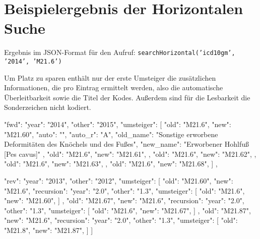 \section{Beispielergebnis der Horizontalen Suche}
\label{search-horizontal-example}

Ergebnis im JSON-Format für den Aufruf: \newline \texttt{searchHorizontal('icd10gm', '2014', 'M21.6')}

Um Platz zu sparen enthält nur der erste Umsteiger die zusätzlichen Informationen, die pro Eintrag ermittelt werden, also die automatische Überleitbarkeit sowie die Titel der Kodes. Außerdem sind für die Lesbarkeit die Sonderzeichen nicht kodiert. \\

\begin{Code}
{
  "fwd": {
    "year": "2014",
    "other": "2015",
    "umsteiger": [
      {
        "old": "M21.6",
        "new": "M21.60",
        "auto": "",
        "auto_r": "A",
        "old_name": "Sonstige erworbene Deformitäten des Knöchels und des Fußes",
        "new_name": "Erworbener Hohlfuß [Pes cavus]"
      },
      {
        "old": "M21.6",
        "new": "M21.61",
      },
      {
        "old": "M21.6",
        "new": "M21.62",
      },
      {
        "old": "M21.6",
        "new": "M21.63",
      },
      {
        "old": "M21.6",
        "new": "M21.68",
      }
    ]
  },









  "rev": {
    "year": "2013",
    "other": "2012",
    "umsteiger": [
      {
        "old": "M21.60",
        "new": "M21.6",
        "recursion": {
          "year": "2.0",
          "other": "1.3",
          "umsteiger": [
            {
              "old": "M21.6",
              "new": "M21.60",
            }
          ]
        }
      },
      {
        "old": "M21.67",
        "new": "M21.6",
        "recursion": {
          "year": "2.0",
          "other": "1.3",
          "umsteiger": [
            {
              "old": "M21.6",
              "new": "M21.67",
            }
          ]
        }
      },
      {
        "old": "M21.87",
        "new": "M21.6",
        "recursion": {
          "year": "2.0",
          "other": "1.3",
          "umsteiger": [
            {
              "old": "M21.8",
              "new": "M21.87",
            }
          ]
        }
      }
    ]
  }
}
\end{Code}


